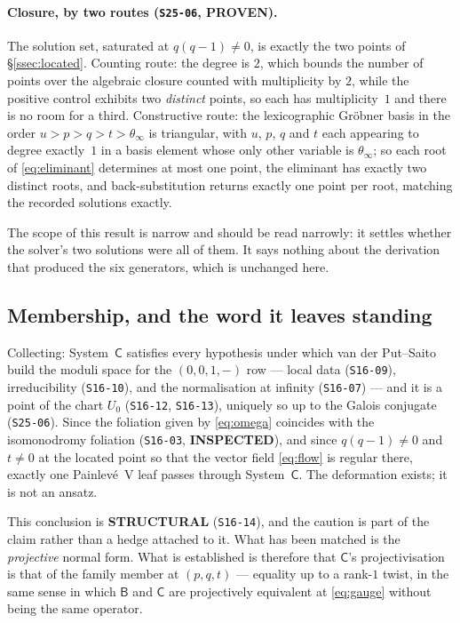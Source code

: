 \paragraph{Closure, by two routes (\texttt{S25-06}, \textbf{PROVEN}).}
The solution set, saturated at $q(q-1)\neq0$, is exactly the two points of
\S\ref{ssec:located}. Counting route: the degree is $2$, which bounds the
number of points over the algebraic closure counted with multiplicity by $2$,
while the positive control exhibits two \emph{distinct} points, so each has
multiplicity~$1$ and there is no room for a third. Constructive route: the
lexicographic Gr\"obner basis in the order $u>p>q>t>\theta_\infty$ is
triangular, with $u$, $p$, $q$ and $t$ each appearing to degree exactly~$1$ in
a basis element whose only other variable is $\theta_\infty$; so each root of
\eqref{eq:eliminant} determines at most one point, the eliminant has exactly
two distinct roots, and back-substitution returns exactly one point per root,
matching the recorded solutions exactly.

The scope of this result is narrow and should be read narrowly: it settles
whether the solver's two solutions were all of them. It says nothing about the
derivation that produced the six generators, which is unchanged here.

\subsection{Membership, and the word it leaves standing}
\label{ssec:membership-verdict}

Collecting: System~$\mathsf C$ satisfies every hypothesis under which van der
Put--Saito build the moduli space for the $(0,0,1,-)$ row --- local data
(\texttt{S16-09}), irreducibility (\texttt{S16-10}), and the normalisation at
infinity (\texttt{S16-07}) --- and it is a point of the chart $U_0$
(\texttt{S16-12}, \texttt{S16-13}), uniquely so up to the Galois conjugate
(\texttt{S25-06}). Since the foliation given by \eqref{eq:omega} coincides with
the isomonodromy foliation (\texttt{S16-03}, \textbf{INSPECTED}), and since
$q(q-1)\neq0$ and $t\neq0$ at the located point so that the vector field
\eqref{eq:flow} is regular there, exactly one Painlev\'e~V leaf passes through
System~$\mathsf C$. The deformation exists; it is not an ansatz.

This conclusion is \textbf{STRUCTURAL} (\texttt{S16-14}), and the caution is
part of the claim rather than a hedge attached to it. What has been matched is
the \emph{projective} normal form. What is established is therefore that
$\mathsf C$'s projectivisation is that of the family member at $(p,q,t)$ ---
equality up to a rank-$1$ twist, in the same sense in which $\mathsf B$ and
$\mathsf C$ are projectively equivalent at \eqref{eq:gauge} without being the
same operator.

